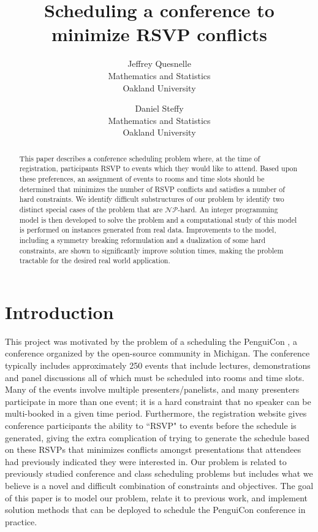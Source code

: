 \documentclass[]{article}
\title{Scheduling a conference to minimize RSVP conflicts}
\author{
Jeffrey Quesnelle\\
Mathematics and Statistics\\
Oakland University \and 
Daniel Steffy\\
Mathematics and Statistics\\
Oakland University}
\theoremstyle{definition}
\theoremstyle{remark}
\numberwithin{equation}{section}
\newcommand{\cNP}{$\mathcal{NP}$}
\begin{document}
\maketitle

\begin{abstract}
This paper describes a conference scheduling problem where, at the time of registration, participants RSVP to events which they would like to attend.
Based upon these preferences, an assignment of events to rooms and time slots should be determined that minimizes the number of RSVP conflicts and satisfies a number of hard constraints.
We identify difficult substructures of our problem by identify two distinct special cases of the problem that are \cNP-hard.
An integer programming model is then developed to solve the problem and a computational study of this model is performed on instances generated from real data.
Improvements to the model, including a symmetry breaking reformulation and a dualization of some hard constraints, are shown to significantly improve solution times, making the problem tractable for the desired real world application.
\end{abstract}

\section{Introduction}

This project was motivated by the problem of a scheduling the PenguiCon , a conference organized by the open-source community in Michigan.  
The conference typically includes approximately 250 events that include lectures, demonstrations and panel discussions all of which must be scheduled into rooms and time slots.
Many of the events involve multiple presenters/panelists, and many presenters participate in more than one event; it is a hard constraint that no speaker can be multi-booked in a given time period.
Furthermore, the registration website gives conference participants the ability to ``RSVP" to events before the schedule is generated, giving the extra complication of trying to generate the schedule based on these RSVPs that minimizes conflicts amongst presentations that attendees had previously indicated they were interested in.
Our problem is related to previously studied conference and class scheduling problems but includes what we believe is a novel and difficult combination of constraints and objectives.
The goal of this paper is to model our problem, relate it to previous work, and implement solution methods that can be deployed to schedule the PenguiCon conference in practice.
\end{document}
